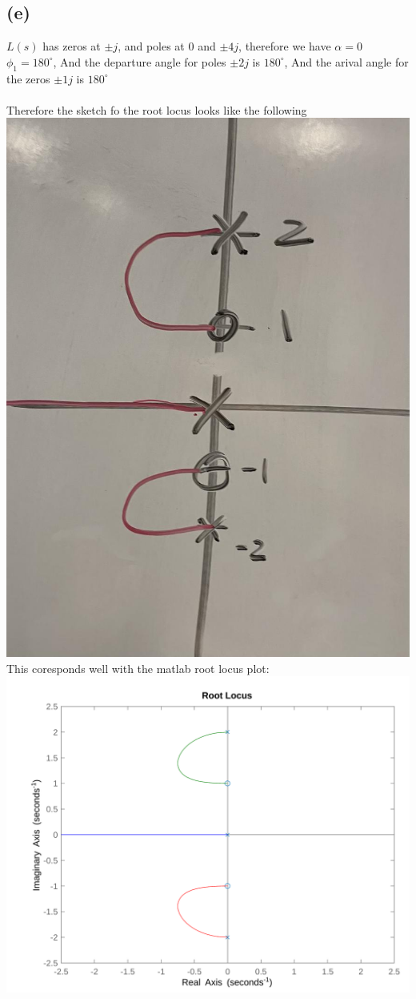 \documentclass[12pt]{article}
\begin{document}
\subsection*{(e)}
$L(s)$ has zeros at $\pm j$, and poles at $0$ and $\pm4j$, therefore we have $\alpha=0$
$\phi_{1}=180^{\circ}$, 
And the departure angle for poles $\pm2j$ is $180^{\circ}$, And the arival angle for the zeros $\pm1j$ is $180^{\circ}$\\\\
Therefore the sketch fo the root locus looks like the following
\\
\includegraphics[scale=.15]{Problem1Sketch2.jpg}
\\This coresponds well with the matlab root locus plot:\\
\includegraphics[scale=.15]{Problem1Matlab2.png}
\end{document}
